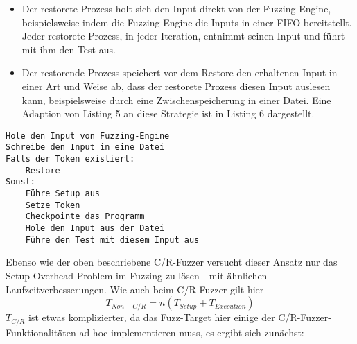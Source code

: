 \documentclass[a4paper]{article}
\begin{document}
\begin{itemize}
        \begin{itemize}
            \item Der restorete Prozess holt sich den Input direkt von der Fuzzing-Engine, beispielsweise indem die Fuzzing-Engine die Inputs in einer FIFO bereitstellt. Jeder restorete Prozess, in jeder Iteration, entnimmt seinen Input und führt mit ihm den Test aus.
            \item Der restorende Prozess speichert vor dem Restore den erhaltenen Input in einer Art und Weise ab, dass der restorete Prozess diesen Input auslesen kann, beispielsweise durch eine Zwischenspeicherung in einer Datei. Eine Adaption von Listing 5 an diese Strategie ist in Listing 6 dargestellt.
        \end{itemize}
\end{itemize}
\begin{lstlisting}[caption=Struktur C/R-Fuzz-Target für Non-C/R-Fuzzer mit Zwischenspeicherung des Inputs]
Hole den Input von Fuzzing-Engine
Schreibe den Input in eine Datei
Falls der Token existiert:
    Restore
Sonst:
    Führe Setup aus
    Setze Token
    Checkpointe das Programm
    Hole den Input aus der Datei
    Führe den Test mit diesem Input aus
\end{lstlisting}
Ebenso wie der oben beschriebene C/R-Fuzzer versucht dieser Ansatz nur das Setup-Overhead-Problem im Fuzzing zu lösen - mit ähnlichen Laufzeitverbesserungen. Wie auch beim C/R-Fuzzer gilt hier
\begin{equation}
    T_{Non-C/R} = n (T_{Setup} + T_{Execution})
\end{equation}
$T_{C/R}$ ist etwas komplizierter, da das Fuzz-Target hier einige der C/R-Fuzzer-Funktionalitäten ad-hoc implementieren muss, es ergibt sich zunächst:
\end{document}
